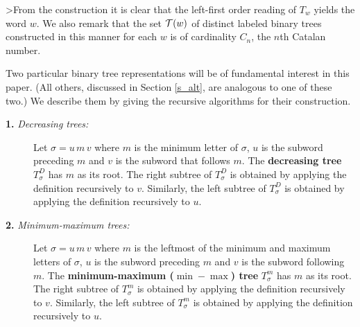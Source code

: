 >From the construction it is clear that the left-first order reading 
of $T_{w}$ yields the word $w$.
We also remark that the set ${\cal T}(w)$ of distinct labeled binary trees constructed
in this manner  for each $w$ is of cardinality $C_n$,  the $n$th Catalan
number. 

Two particular binary tree representations will be of fundamental
interest in this paper. (All others, discussed in Section \ref{s_alt}, are
analogous to one of these two.) We describe them by giving the recursive
algorithms for their construction. 

\begin{description}
\item[{\bf 1.} {\em Decreasing trees:}]

\noindent
Let $\sigma = u\,m\,v$ where $m$ is the minimum letter of $\sigma$,
$u$ is the subword preceding $m$  and $v$ is the subword that follows $m$.
The {\bf decreasing tree} $T^D_\sigma$ has $m$ as its root.  The right
subtree of $T^D_\sigma$ is obtained by applying the definition
recursively to $v$. 
Similarly, the left subtree of $T^D_\sigma$ is obtained by applying the
definition recursively to $u$. 

\item[{\bf 2.} {\em Minimum-maximum trees:}]

\noindent
Let $\sigma = u\,m\,v$ where $m$ is the leftmost of the minimum and maximum
letters of $\sigma$,
$u$ is the subword preceding $m$  and $v$ is the subword  following 
$m$.
The {\bf minimum-maximum ($\min-\max$) tree} $T^m_\sigma$ has $m$ as its
root.  The right subtree of $T^m_\sigma$ is obtained by applying the
definition recursively to $v$. 
Similarly, the left subtree of $T^m_\sigma$ is obtained by applying the
definition recursively to $u$. 
\end{description}

